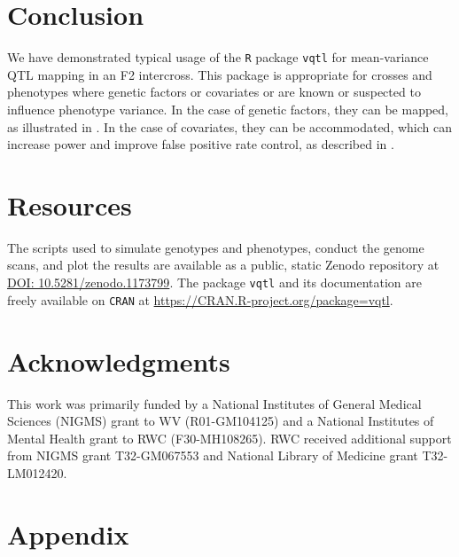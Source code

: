 \documentclass[9pt,twocolumn,twoside]{gsag3jnl}
\begin{document}
\section*{Conclusion}

We have demonstrated typical usage of the \texttt{R} package \texttt{vqtl} for mean-variance QTL mapping in an F2 intercross.
This package is appropriate for crosses and phenotypes where genetic factors or covariates or are known or suspected to influence phenotype variance.
In the case of genetic factors, they can be mapped, as illustrated in \CortyReanalysisPaper.
In the case of covariates, they can be accommodated, which can increase power and improve false positive rate control, as described in \CortyMethodsPaper.

\section*{Resources}
The scripts used to simulate genotypes and phenotypes, conduct the genome scans, and plot the results are available as a public, static Zenodo repository at \url{DOI: 10.5281/zenodo.1173799}.
The package \texttt{vqtl} and its documentation are freely available on \texttt{CRAN} at \url{https://CRAN.R-project.org/package=vqtl}.


\section{Acknowledgments}
This work was primarily funded by a National Institutes of General Medical Sciences (NIGMS) grant to WV (R01-GM104125) and a National Institutes of Mental Health grant to RWC (F30-MH108265).
RWC received additional support from NIGMS grant T32-GM067553 and National Library of Medicine grant T32-LM012420.





\clearpage
\newpage
\section*{Appendix}
\end{document}
